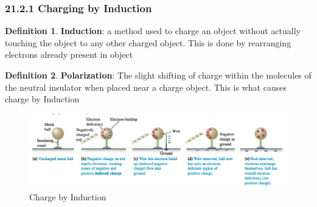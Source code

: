 \documentclass[12pt]{amsart}
\theoremstyle{definition}
\newtheorem{definition}{Definition} %
\numberwithin{equation}{theorem}    %
\begin{document}
\subsubsection*{21.2.1 Charging by Induction}

\begin{definition}
    \textbf{Induction}: 
    a method used to charge an object without actually touching the object to 
    any other charged object. This is done by rearranging electrons already 
    present in object
\end{definition}

\begin{definition}
    \textbf{Polarization}: 
    The slight shifting of charge within the molecules of the neutral insulator
    when placed near a charge object. This is what causes charge by Induction
\end{definition}

\begin{figure}[H]
    \centering
    \includegraphics[width=5in]{Media/Induction.png}
    \caption{Charge by Induction}
    \label{Charge by Induction}
\end{figure}
\end{document}
